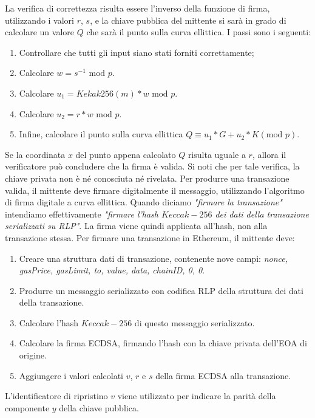 %
La verifica di correttezza risulta essere l'inverso della funzione di firma, utilizzando i valori $r$, $s$, e la chiave pubblica del mittente si sarà in grado di calcolare un valore $Q$ che sarà il punto sulla curva ellittica. I passi sono i seguenti:
\begin{enumerate}
	\item Controllare che tutti gli input siano stati forniti correttamente;
	\item Calcolare $ w = s^{-1} \text{ mod }p $.
	\item Calcolare $ u_{1} = Kekak256( m ) * w \text{ mod } p $.
	\item Calcolare $ u_{2} = r * w \text{ mod } p $.
	\item Infine, calcolare il punto sulla curva ellittica $ Q \equiv u_{1} * G + u_{2} * K (\text{mod } p)$.
\end{enumerate}
Se la coordinata $x$ del punto appena calcolato $Q$ risulta uguale a $r$, allora il verificatore può concludere che la firma è valida. Si noti che per tale verifica, la chiave privata non è né conosciuta né rivelata.
Per produrre una transazione valida, il mittente deve firmare digitalmente il messaggio, utilizzando l'algoritmo di firma digitale a curva ellittica. Quando diciamo \textit{"firmare la transazione"} intendiamo effettivamente \textit{"firmare l'hash $Keccak-256$ dei dati della transazione serializzati su RLP"}. La firma viene quindi applicata all'hash, non alla transazione stessa. Per firmare  una transazione in Ethereum, il mittente deve:
\begin{enumerate}
	\item Creare una struttura dati di transazione, contenente nove campi: \textit{nonce, gasPrice, gasLimit, to, value, data, chainID, 0, 0}.
	\item Produrre un messaggio serializzato con codifica RLP della struttura dei dati della transazione.
	\item Calcolare l'hash $Keccak-256$ di questo messaggio serializzato.
	\item Calcolare la firma ECDSA, firmando l'hash con la chiave privata dell'EOA di origine.
	\item Aggiungere i valori calcolati $v$, $r$ e $s$ della firma ECDSA alla transazione.
\end{enumerate}
L'identificatore di ripristino $v$ viene utilizzato per indicare la parità della componente $y$ della chiave pubblica.
